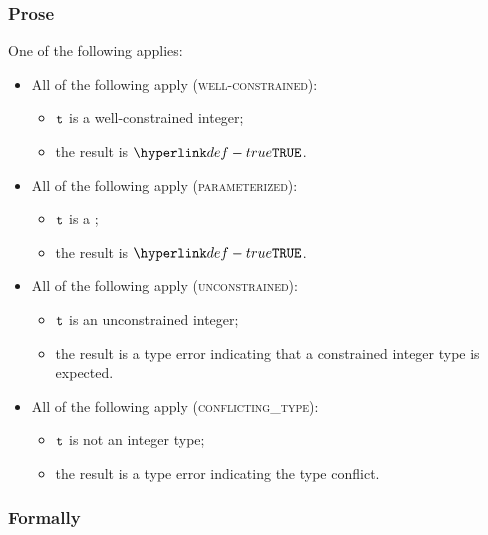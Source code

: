 \subsubsection{Prose}
One of the following applies:
\begin{itemize}
  \item All of the following apply (\textsc{well-constrained}):
  \begin{itemize}
    \item $\texttt{t}$ is a well-constrained integer;
    \item the result is $\True$.
  \end{itemize}

  \item All of the following apply (\textsc{parameterized}):
  \begin{itemize}
    \item $\texttt{t}$ is a \parameterizedintegertype;
    \item the result is $\True$.
  \end{itemize}

  \item All of the following apply (\textsc{unconstrained}):
  \begin{itemize}
    \item $\texttt{t}$ is an unconstrained integer;
    \item the result is a type error indicating that a constrained integer type is expected.
  \end{itemize}

  \item All of the following apply (\textsc{conflicting\_type}):
  \begin{itemize}
    \item $\texttt{t}$ is not an integer type;
    \item the result is a type error indicating the type conflict.
  \end{itemize}
\end{itemize}



\subsubsection{Formally}

